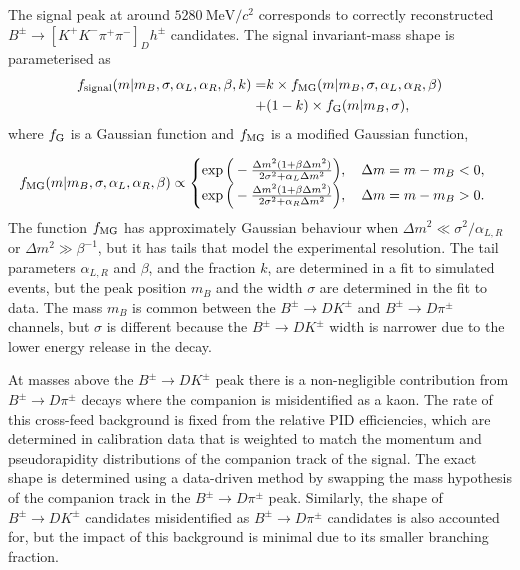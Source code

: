\documentclass[12pt, a4paper, notitlepage, onecolumn]{article}
\begin{document}
The signal peak at around $\SI{5280}{\mega\eV/c^2}$ corresponds to correctly reconstructed $B^\pm\to[K^+K^-\pi^+\pi^-]_Dh^\pm$ candidates. The signal invariant-mass shape is parameterised as
\begin{equation}
    \begin{aligned}
        f_{\rm signal}(m|m_B, \sigma, \alpha_L, \alpha_R, \beta, k) =& k\times f_{\rm MG}(m|m_B, \sigma, \alpha_L, \alpha_R, \beta) \\
                                                                     +& (1 - k)\times f_{\rm G}(m|m_B, \sigma),
    \end{aligned}
\end{equation}
where $f_{\rm G}$ is a Gaussian function and $f_{\rm MG}$ is a modified Gaussian function,

\begin{equation}
    f_{\rm MG}(m|m_B, \sigma, \alpha_L, \alpha_R, \beta)\propto
    \begin{cases}
        \exp\Big(-\frac{\Delta m^2(1 + \beta\Delta m^2)}{2\sigma^2 + \alpha_L\Delta m^2}\Big), \quad \Delta m = m - m_B < 0, \\
        \exp\Big(-\frac{\Delta m^2(1 + \beta\Delta m^2)}{2\sigma^2 + \alpha_R\Delta m^2}\Big), \quad \Delta m = m - m_B > 0.
    \end{cases}
\end{equation}
The function $f_{\rm MG}$ has approximately Gaussian behaviour when $\Delta m^2\ll\sigma^2/\alpha_{L, R}$ or $\Delta m^2\gg\beta^{-1}$, but it has tails that model the experimental resolution. The tail parameters $\alpha_{L, R}$ and $\beta$, and the fraction $k$, are determined in a fit to simulated events, but the peak position $m_B$ and the width $\sigma$ are determined in the fit to data. The mass $m_B$ is common between the $B^\pm\to DK^\pm$ and $B^\pm\to D\pi^\pm$ channels, but $\sigma$ is different because the $B^\pm\to DK^\pm$ width is narrower due to the lower energy release in the decay.

At masses above the $B^\pm\to DK^\pm$ peak there is a non-negligible contribution from $B^\pm\to D\pi^\pm$ decays where the companion is misidentified as a kaon. The rate of this cross-feed background is fixed from the relative PID efficiencies, which are determined in calibration data that is weighted to match the momentum and pseudorapidity distributions of the companion track of the signal. The exact shape is determined using a data-driven method by swapping the mass hypothesis of the companion track in the $B^\pm\to D\pi^\pm$ peak. Similarly, the shape of $B^\pm\to DK^\pm$ candidates misidentified as $B^\pm\to D\pi^\pm$ candidates is also accounted for, but the impact of this background is minimal due to its smaller branching fraction.
\end{document}
